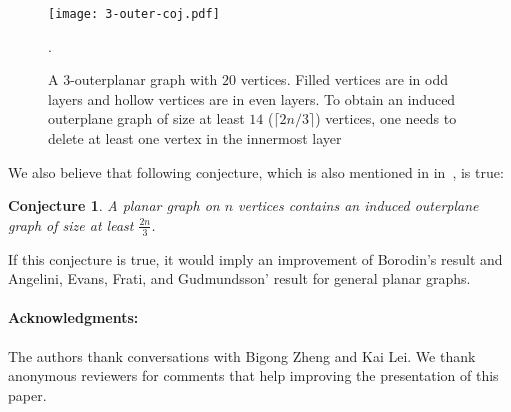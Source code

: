 \documentclass[11pt]{article}
\newtheorem{conjecture}[theorem]{Conjecture}
\begin{document}
\begin{figure}
\centering
\texttt{[image: 3-outer-coj.pdf]}
\caption{A 3-outerplanar graph with $20$ vertices. Filled vertices are in odd layers and hollow vertices are in even layers. To obtain an induced outerplane graph of size at least $14$ ($\lceil 2n/3 \rceil$) vertices, one needs to delete at least one vertex in the innermost layer}.
\label{fig:3-outer-ex}
\end{figure}

  
We also believe that following conjecture, which is also mentioned in in~\cite{AEFG16}, is true:

\begin{conjecture}\label{conj:planar-outer}
A planar graph on $n$ vertices contains an induced outerplane graph of size at least $\frac{2n}{3}$.
\end{conjecture}

If this conjecture is true, it would imply an improvement of Borodin's result and Angelini, Evans, Frati, and Gudmundsson' result for general planar graphs. 

\paragraph{Acknowledgments:} The authors thank conversations with Bigong Zheng and Kai Lei. We thank anonymous reviewers for comments that help improving the presentation of this paper. 

 

\end{document}
